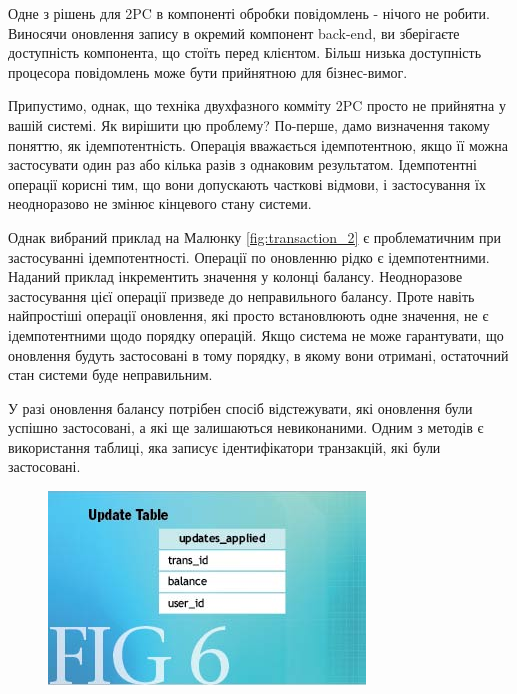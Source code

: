 \documentclass[14pt]{vakthesis}
\begin{document}
Одне з рішень для 2PC в компоненті обробки повідомлень - нічого не робити. Виносячи оновлення запису в окремий компонент back-end, ви зберігаєте доступність компонента, що стоїть перед клієнтом. Більш низька доступність процесора повідомлень може бути прийнятною для бізнес-вимог.

Припустимо, однак, що техніка двухфазного комміту 2PC просто не прийнятна у вашій системі. Як вирішити цю проблему? 
По-перше, дамо визначення такому поняттю, як ідемпотентність. Операція вважається ідемпотентною, якщо її можна застосувати один раз або кілька разів з однаковим результатом. Ідемпотентні операції корисні тим, що вони допускають часткові відмови, і застосування їх неодноразово не змінює кінцевого стану системи.

Однак вибраний приклад на Малюнку \ref{fig:transaction_2} є проблематичним при застосуванні ідемпотентності. 
Операції по оновленню рідко є ідемпотентними. Наданий приклад інкрементить значення у колонці балансу. 
Неодноразове застосування цієї операції призведе до неправильного балансу. 
Проте навіть найпростіші операції оновлення, які просто встановлюють одне значення, не є ідемпотентними щодо порядку операцій.
Якщо система не може гарантувати, що оновлення будуть застосовані в тому порядку, в якому вони отримані, остаточний стан системи буде неправильним.

У разі оновлення балансу потрібен спосіб відстежувати, які оновлення були успішно застосовані, а які ще залишаються невиконаними. 
Одним з методів є використання таблиці, яка записує ідентифікатори транзакцій, які були застосовані.

\begin{figure}
\centering
\includegraphics[width=\linewidth]{images/fig6.jpg}
     \label{fig:fig_6}
\end{figure}
\end{document}
